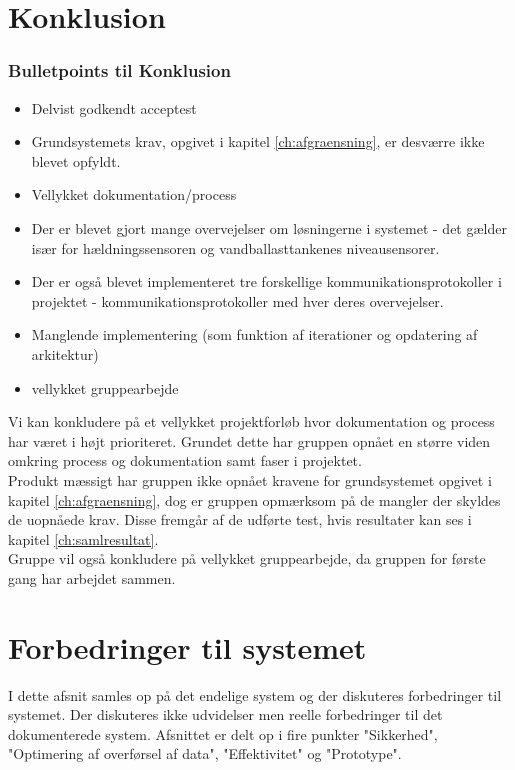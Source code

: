 \chapter{Konklusion}
\label{ch:konklusion}
\subsection{Bulletpoints til Konklusion}
\begin{itemize}
\item Delvist godkendt acceptest
\item Grundsystemets krav, opgivet i kapitel \ref{ch:afgraensning}, er desværre ikke blevet opfyldt.
\item Vellykket dokumentation/process
\item Der er blevet gjort mange overvejelser om løsningerne i systemet - det gælder især for hældningssensoren og vandballasttankenes niveausensorer.
\item Der er også blevet implementeret tre forskellige kommunikationsprotokoller i projektet - kommunikationsprotokoller med hver deres overvejelser.  
\item Manglende implementering (som funktion af iterationer og opdatering af arkitektur)
\item vellykket gruppearbejde
\end{itemize}

Vi kan konkludere på et vellykket projektforløb hvor dokumentation og process har været i højt prioriteret. Grundet dette har gruppen opnået en større viden omkring process og dokumentation samt faser i projektet. \\
Produkt mæssigt har gruppen ikke opnået kravene for grundsystemet opgivet i kapitel \ref{ch:afgraensning}, dog er gruppen opmærksom på de mangler der skyldes de uopnåede krav. Disse fremgår af de udførte test, hvis resultater kan ses i kapitel \ref{ch:samlresultat}.\\
Gruppe vil også konkludere på vellykket gruppearbejde, da gruppen for første gang har arbejdet sammen.\\ 



\chapter{Forbedringer til systemet}
\label{ch:Forbedringer}
I dette afsnit samles op på det endelige system og der diskuteres forbedringer til systemet. Der diskuteres ikke udvidelser men reelle forbedringer til det dokumenterede system. Afsnittet er delt op i fire punkter "Sikkerhed", "Optimering af overførsel af data", "Effektivitet" og "Prototype". 

